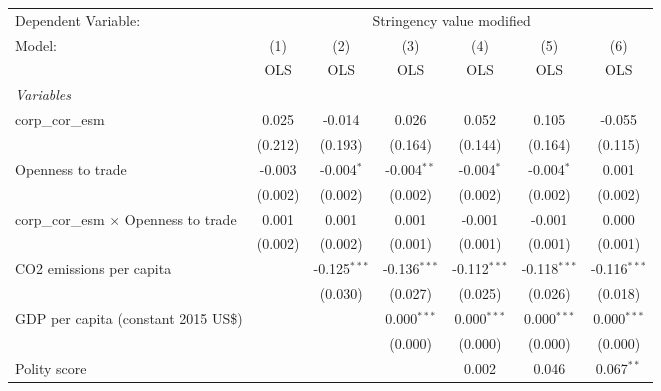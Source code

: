 
\begingroup
\centering
\begin{tabular}{lcccccc}
   \toprule
   Dependent Variable: & \multicolumn{6}{c}{Stringency value modified}\\
   Model:                                       & (1)     & (2)            & (3)            & (4)            & (5)            & (6)\\  
                                                &  OLS    & OLS            & OLS            & OLS            & OLS            & OLS\\  
   \midrule
   \emph{Variables}\\
   corp\_cor\_esm                               & 0.025   & -0.014         & 0.026          & 0.052          & 0.105          & -0.055\\   
                                                & (0.212) & (0.193)        & (0.164)        & (0.144)        & (0.164)        & (0.115)\\   
   Openness to trade                            & -0.003  & -0.004$^{*}$   & -0.004$^{**}$  & -0.004$^{*}$   & -0.004$^{*}$   & 0.001\\   
                                                & (0.002) & (0.002)        & (0.002)        & (0.002)        & (0.002)        & (0.002)\\   
   corp\_cor\_esm $\times$ Openness to trade    & 0.001   & 0.001          & 0.001          & -0.001         & -0.001         & 0.000\\   
                                                & (0.002) & (0.002)        & (0.001)        & (0.001)        & (0.001)        & (0.001)\\   
   CO2 emissions per capita                     &         & -0.125$^{***}$ & -0.136$^{***}$ & -0.112$^{***}$ & -0.118$^{***}$ & -0.116$^{***}$\\   
                                                &         & (0.030)        & (0.027)        & (0.025)        & (0.026)        & (0.018)\\   
   GDP per capita (constant 2015 US\$)          &         &                & 0.000$^{***}$  & 0.000$^{***}$  & 0.000$^{***}$  & 0.000$^{***}$\\   
                                                &         &                & (0.000)        & (0.000)        & (0.000)        & (0.000)\\   
   Polity score                                 &         &                &                & 0.002          & 0.046          & 0.067$^{**}$\\   

\end{tabular}
